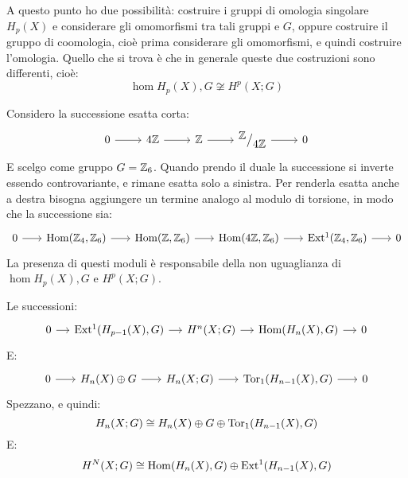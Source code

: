A questo punto ho due possibilità: costruire i gruppi di omologia singolare
$ H_p(X) $ e considerare gli omomorfismi tra tali gruppi e $ G $, oppure
costruire il gruppo di coomologia, cioè prima considerare gli omomorfismi, e
quindi costruire l'omologia. Quello che si trova è che in generale queste
due costruzioni sono differenti, cioè:
\[
  \hom{H_p(X), G} \not \cong H^p(X ; G)
\]

\begin{example}
  Considero la successione esatta corta:
  \[
    \begin{tikzcd}
      0 \rar & 4 \Z \rar & \Z \rar & \quot{\Z}{4\Z} \rar & 0
    \end{tikzcd}
  \]
  E scelgo come gruppo $ G = \mathbb{Z}_6 $.
  Quando prendo il duale la successione si inverte essendo controvariante,
  e rimane esatta solo a sinistra. Per renderla esatta anche a destra bisogna
  aggiungere un termine analogo al modulo di torsione, in modo che la successione
  sia:
  \[
    \begin{tikzcd}[nodes = {column sep = 18 pt}]
      0 \rar & \hom{\Z_4, \Z_6} \rar & \hom{\Z, \Z_6} \rar & \hom{4\Z, \Z_6} \rar & \ext{\Z_4, \Z_6} \rar & 0
    \end{tikzcd}
  \]
  La presenza di questi moduli è responsabile della non uguaglianza di $ \hom{H_p(X), G} $ e $ H^p(X ; G) $.
\end{example}
\begin{theorem}
  Le successioni:
  \[
    \begin{tikzcd}[nodes = {column sep = 12 pt}]
      0 \rar & \ext{H_{p-1}(X), G} \rar & H^n(X;G) \rar & \hom{H_n(X), G} \rar & 0
    \end{tikzcd}
  \]
  E:
  \[
    \begin{tikzcd}[nodes = {column sep = 18 pt}]
      0 \rar & H_n(X) \oplus G \rar & H_n(X; G) \rar & \tor{H_{n-1}(X), G} \rar & 0
    \end{tikzcd}
  \]
  Spezzano, e quindi:
  \[
    H_n(X; G) \cong H_n(X) \oplus G \oplus \mathrm{Tor_1}( H_{n-1}(X), G)
  \]
  E:
  \[
    H^N(X; G) \cong \mathrm{Hom}( H_n(X), G) \oplus \mathrm{Ext^1}( H_{n-1}(X), G)
  \]
\end{theorem}

